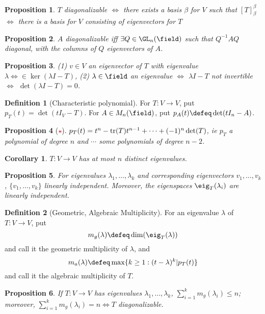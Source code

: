 \documentclass[12pt, oneside]{article}
\theoremstyle{definition}
\newtheorem{defn}{Definition}
\theoremstyle{plain}
\newtheorem{cor}{Corollary}
\newtheorem{prop}{Proposition}
\theoremstyle{remark}
\begin{document}
\begin{prop}
  $T$ diagonalizable $\iff$ there exists a basis $\beta$ for $V$ such that $[T]_\beta^\beta$ $\iff$ there is a basis for $V$ consisting of eigenvectors for $T$
\end{prop}

\begin{prop}
  $A$ diagonalizable iff $\exists Q \in \GL_n(\field)$ such that $Q^{-1}A Q$ diagonal, with the columns of $Q$ eigenvectors  of $A$.
\end{prop}

\begin{prop}
  (1) $v \in V$ an eigenvector of $T$ with eigenvalue $\lambda \iff \in \ker(\lambda I - T)$, (2) $\lambda \in \field$ an eigenvalue $\iff$ $\lambda I - T$ not invertible $\iff$ $\det(\lambda I - T) = 0$.
\end{prop}

\begin{defn}[Characteristic polynomial]
  For $T : V \to V$, put $p_T(t) = \det(tI_V - T)$. For $A \in M_n(\field)$, put $p_A(t) \defeq \det(tI_n - A)$.
\end{defn}

\begin{prop}[\textcolor{red}{$\star$}]
  $p_T(t) = t^n - \tr(T)t^{n-1} + \cdots + (-1)^n \det(T)$, ie $p_T$ a polynomial of degree $n$ and $\cdots$ some polynomials of degree $n-2$.
\end{prop}

\begin{cor}
  $T : V \to V$ has at most $n$ distinct eigenvalues.
\end{cor}

\begin{prop}
  For eigenvalues $\lambda_1, \dots, \lambda_k$ and corresponding eigenvectors $v_1, \dots, v_k$, $\{v_1, \dots, v_k\}$ linearly independent. Moreover, the eigenspaces $\eig_T(\lambda_i)$ are linearly independent.
\end{prop}

\begin{defn}[Geometric, Algebraic Multiplicity]
  For an eigenvalue $\lambda$ of $T : V \to V$, put \[
  m_g(\lambda) \defeq \dim(\eig_T(\lambda)) 
  \]
  and call it the geometric multiplicity of $\lambda$, and \[
  m_a(\lambda) \defeq \max \{k \geq 1 : (t - \lambda)^k \vert p_T(t)\}
  \]
  and call it the algebraic multiplicity of $T$.
\end{defn}

\begin{prop}
  If $T : V \to V$ has eigenvalues $\lambda_1, \dots, \lambda_k$, $\sum_{i=1}^k m_g(\lambda_i) \leq n$; moreover, $\sum_{i=1}^k m_g(\lambda_i) = n \iff T$ diagonalizable.
\end{prop}
\end{document}
